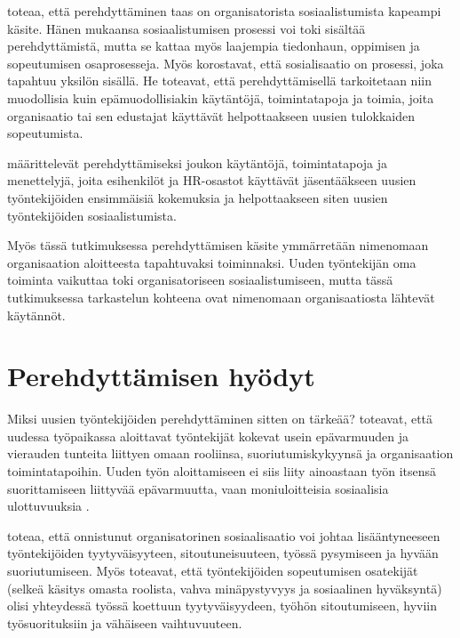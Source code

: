 \documentclass[utf8]{gradu3}
\begin{document}
\textcite{wanberg-2012} toteaa, että perehdyttäminen taas on organisatorista sosiaalistumista kapeampi käsite. Hänen mukaansa sosiaalistumisen prosessi voi toki sisältää perehdyttämistä, mutta se kattaa myös laajempia tiedonhaun, oppimisen ja sopeutumisen osaprosesseja. Myös \textcite{klein-polin-2012} korostavat, että sosialisaatio on prosessi, joka tapahtuu yksilön sisällä. He toteavat, että perehdyttämisellä tarkoitetaan niin muodollisia kuin epämuodollisiakin käytäntöjä, toimintatapoja ja toimia, joita organisaatio tai sen edustajat käyttävät helpottaakseen uusien tulokkaiden sopeutumista.


\textcite{klein-polin-2012} määrittelevät perehdyttämiseksi joukon käytäntöjä, toimintatapoja ja menettelyjä, joita esihenkilöt ja HR-osastot käyttävät jäsentääkseen uusien työntekijöiden ensimmäisiä kokemuksia ja helpottaakseen siten uusien työntekijöiden sosiaalistumista.

Myös tässä tutkimuksessa perehdyttämisen käsite ymmärretään nimenomaan organisaation aloitteesta tapahtuvaksi toiminnaksi. Uuden työntekijän oma toiminta vaikuttaa toki organisatoriseen sosiaalistumiseen, mutta tässä tutkimuksessa tarkastelun kohteena ovat nimenomaan organisaatiosta lähtevät käytännöt.

\section{Perehdyttämisen hyödyt}

Miksi uusien työntekijöiden perehdyttäminen sitten on tärkeää? \textcite{saks-gruman-2012} toteavat, että uudessa työpaikassa aloittavat työntekijät kokevat usein epävarmuuden ja vierauden tunteita liittyen omaan rooliinsa, suoriutumiskykyynsä ja organisaation toimintatapoihin. Uuden työn aloittamiseen ei siis liity ainoastaan työn itsensä suorittamiseen liittyvää epävarmuutta, vaan moniuloitteisia sosiaalisia ulottuvuuksia \parencite{saks-gruman-2012}. 

\textcite{wanberg-2012} toteaa, että onnistunut organisatorinen sosiaalisaatio voi johtaa lisääntyneeseen työntekijöiden tyytyväisyyteen, sitoutuneisuuteen, työssä pysymiseen ja hyvään suoriutumiseen. Myös \textcite{bauer-ym-2007} toteavat, että työntekijöiden sopeutumisen osatekijät (selkeä käsitys omasta roolista, vahva minäpystyvyys ja sosiaalinen hyväksyntä) olisi yhteydessä työssä koettuun tyytyväisyydeen, työhön sitoutumiseen, hyviin työsuorituksiin ja vähäiseen vaihtuvuuteen. 
\end{document}
